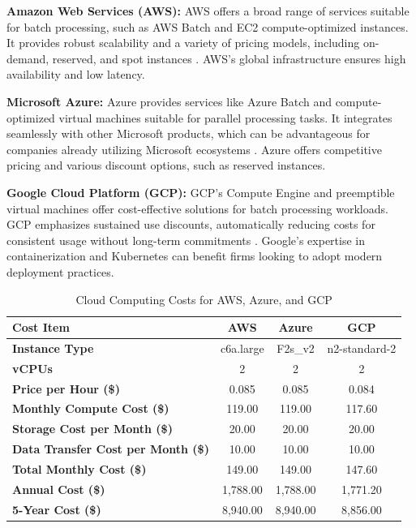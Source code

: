 \documentclass{article}
\begin{document}
\textbf{Amazon Web Services (AWS):}
AWS offers a broad range of services suitable for batch processing, such as AWS Batch and EC2 compute-optimized instances. It provides robust scalability and a variety of pricing models, including on-demand, reserved, and spot instances \parencite{awspricing}. AWS's global infrastructure ensures high availability and low latency.

\textbf{Microsoft Azure:}
Azure provides services like Azure Batch and compute-optimized virtual machines suitable for parallel processing tasks. It integrates seamlessly with other Microsoft products, which can be advantageous for companies already utilizing Microsoft ecosystems \parencite{azurepricing}. Azure offers competitive pricing and various discount options, such as reserved instances.

\textbf{Google Cloud Platform (GCP):}
GCP's Compute Engine and preemptible virtual machines offer cost-effective solutions for batch processing workloads. GCP emphasizes sustained use discounts, automatically reducing costs for consistent usage without long-term commitments \parencite{gcppricing}. Google's expertise in containerization and Kubernetes can benefit firms looking to adopt modern deployment practices.

\begin{table}[H]
    \centering
    \caption{Cloud Computing Costs for AWS, Azure, and GCP}
    \label{tab:cloud_costs}
    \begin{tabular}{lccc}
    \toprule
    \textbf{Cost Item} & \textbf{AWS} & \textbf{Azure} & \textbf{GCP} \\
    \midrule
    \textbf{Instance Type} & c6a.large & F2s\_v2 & n2-standard-2 \\
    \textbf{vCPUs} & 2 & 2 & 2 \\
    \textbf{Price per Hour (\$)} & 0.085 & 0.085 & 0.084 \\
    \textbf{Monthly Compute Cost (\$)} & 119.00 & 119.00 & 117.60 \\
    \textbf{Storage Cost per Month (\$)} & 20.00 & 20.00 & 20.00 \\
    \textbf{Data Transfer Cost per Month (\$)} & 10.00 & 10.00 & 10.00 \\
    \textbf{Total Monthly Cost (\$)} & 149.00 & 149.00 & 147.60 \\
    \textbf{Annual Cost (\$)} & 1,788.00 & 1,788.00 & 1,771.20 \\
    \textbf{5-Year Cost (\$)} & 8,940.00 & 8,940.00 & 8,856.00 \\
    \bottomrule
    \end{tabular}
    \end{table}
\end{document}
